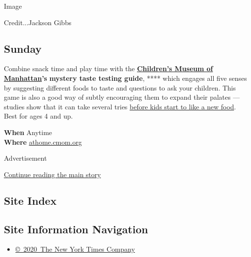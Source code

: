 Image

Credit...Jackson Gibbs

\hypertarget{sunday}{%
\subsection{Sunday}\label{sunday}}

Combine snack time and play time with the
\textbf{\href{https://cmom.org/}{Children's Museum of Manhattan}'s}
\textbf{mystery taste testing guide}, **** which engages all five senses
by suggesting different foods to taste and questions to ask your
children. This game is also a good way of subtly encouraging them to
expand their palates --- studies show that it can take several tries
\href{https://www.nytimes.com/article/kids-healthy-eating-habits.html}{before
kids start to like a new food}. Best for ages 4 and up.

\textbf{When} Anytime\\
\textbf{Where}
\href{https://athome.cmom.org/mystery-taste-testing-and-movement-game/}{athome.cmom.org}

Advertisement

\protect\hyperlink{after-bottom}{Continue reading the main story}

\hypertarget{site-index}{%
\subsection{Site Index}\label{site-index}}

\hypertarget{site-information-navigation}{%
\subsection{Site Information
Navigation}\label{site-information-navigation}}

\begin{itemize}
\tightlist
\item
  \href{https://help.nytimes.com/hc/en-us/articles/115014792127-Copyright-notice}{©~2020~The
  New York Times Company}
\end{itemize}

